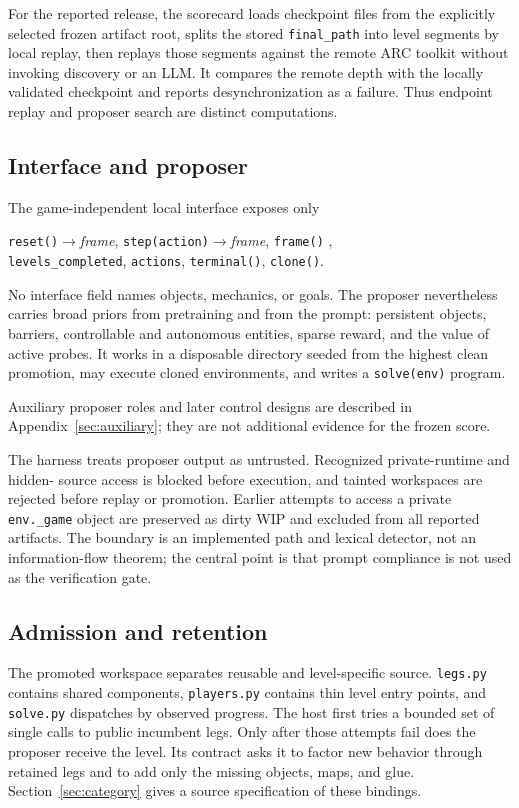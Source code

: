 \documentclass[11pt]{article}
\theoremstyle{definition}
\theoremstyle{remark}
\begin{document}
For the reported release, the scorecard loads checkpoint files from the explicitly
selected frozen artifact root, splits the stored
\texttt{final\_path} into level segments by local replay, then replays those segments
against the remote ARC toolkit without invoking discovery or an LLM. It compares the
remote depth with the locally validated checkpoint and reports desynchronization as a
failure. Thus endpoint replay and proposer search are distinct computations.

\subsection{Interface and proposer}
The game-independent local interface exposes only
\begin{center}
\texttt{reset()}$\to$\emph{frame}, \quad
\texttt{step(action)}$\to$\emph{frame}, \quad
\texttt{frame()} , \\
\texttt{levels\_completed}, \quad \texttt{actions}, \quad
\texttt{terminal()}, \quad \texttt{clone()}.
\end{center}
No interface field names objects, mechanics, or goals. The proposer nevertheless carries
broad priors from pretraining and from the prompt: persistent objects, barriers,
controllable and autonomous entities, sparse reward, and the value of active probes. It
works in a disposable directory seeded from the highest clean promotion, may execute
cloned environments, and writes a \texttt{solve(env)} program.

Auxiliary proposer roles and later control designs are described in
Appendix~\ref{sec:auxiliary}; they are not additional evidence for the frozen score.

The harness treats proposer output as untrusted. Recognized private-runtime and hidden-
source access is blocked before execution, and tainted workspaces are rejected before
replay or promotion. Earlier attempts to access a private \texttt{env.\_game} object are
preserved as dirty WIP and excluded from all reported artifacts. The boundary is an
implemented path and lexical detector, not an information-flow theorem; the central
point is that prompt compliance is not used as the verification gate.

\subsection{Admission and retention}
The promoted workspace separates reusable and level-specific source.
\texttt{legs.py} contains shared components, \texttt{players.py} contains thin level
entry points, and \texttt{solve.py} dispatches by observed progress. The host first
tries a bounded set of single calls to public incumbent legs. Only after those attempts
fail does the proposer receive the level. Its contract asks it to factor new behavior
through retained legs and to add only the missing objects, maps, and glue. Section~\ref{sec:category} gives a source specification of these bindings.
\end{document}
